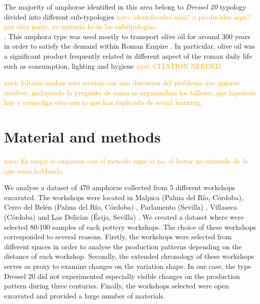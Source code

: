 \documentclass[review]{elsarticle}
\newcommand{\memo}[2]{\textcolor{#1}{#2}}
\newcommand{\xavi}[1]{\memo{orange}{xavi: #1\\}}
\begin{document}

The majority of amphorae identified in this area belong to \emph{Dressel 20} typology divided into different sub-typologies \citep{berni_millet_epigrafianforica_2008, martin-kilcher_romischen_1994}\xavi{identificadas aqui? o producidas aqui? por otra parte, yo quitaria lo de las subtipologias.}. This amphora type was used mostly to transport olive oil for around 300 years in order to satisfy the demand within Roman Empire \citep{rodriguez_economioleicola_1977}. In particular, olive oil was a significant product frequently related in different aspect of the roman daily life such as consumption, lighting and hygiene %
\xavi{CITATION NEEDED}




\xavi{faltaria acabar esta seccion con una discusion del problema que quieres resolver, incluyendo la pregunta de como se organizaban los talleres, que hipotesis hay y como liga esto con lo que has explicado de social learning.}

\section{Material and methods}

\xavi{Es mejor si empiezas con el metodo aqui; si no, el lector no entiende de lo que estas hablando.}

We analyse a dataset of 470 amphorae collected from 5 different workshops excavated. The workshops were located in Malpica (Palma del R\'io, C\'ordoba), Cerro del Bel\'en (Palma del R\'io, C\'ordoba) \citep{diaz_trujillo_excavacion_1992}, Parlamento (Sevilla) \citep{garcia_vargas_anforas_2000}, Villaseca (C\'ordoba)\citep{garcia_vargas_enrique_excavacion_????} and Las Delicias (\'Ecija, Sevilla) \citep{fernandez_excavacion_2001,_atelier_2014}. We created a dataset where were selected 80-100 samples of each pottery workshops. The choice of these workshops corresponded to several reasons. Firstly, the workshops were selected from different spaces in order to analyse the production patterns depending on the distance of each workshop. Secondly, the extended chronology of these workshops serves as proxy to examine changes on the variation shape. In our case, the type Dressel 20 did not experimented especially visible changes on the production pattern during three centuries.%
Finally, the workshops selected were open excavated and provided a large number of materials.   
\end{document}
